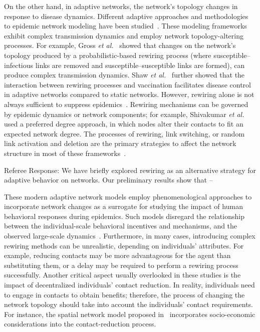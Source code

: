 \documentclass[9pt,twocolumn,twoside]{pnas-new}
\newcommand{\green}[1]{{\textcolor{green!50!black}{#1}}}
\begin{document}
On the other hand, in adaptive networks, the network's topology changes in response to disease dynamics. Different adaptive approaches and methodologies to epidemic network modeling have been studied~\cite{Pastor15,Bansal10}.
These modeling frameworks exhibit complex transmission dynamics and employ network topology-altering processes. For example, Gross {\it et al.}~\cite{gross2006epidemic} showed that changes on the network's topology produced by a probabilistic-based rewiring process (where susceptible–infectious links are removed and susceptible–susceptible links are formed), can produce complex transmission dynamics. Shaw {\it et al.}~\cite{shaw2010enhanced} further showed that the interaction between rewiring processes and vaccination facilitates disease control in adaptive networks compared to static networks.
%
However, rewiring alone is not always sufficient to suppress epidemics~\cite{DONG2015169}. Rewiring mechanisms can be governed by epidemic dynamics or network components; for example, Shivakumar {\it et al.} \cite{Shivakumar12} used a preferred degree approach, in which nodes alter their contacts to fit an expected network degree.
%
The processes of rewiring, link switching, or random link activation and deletion are the primary strategies to affect the network structure in most of these frameworks~\cite{Zhu2019,Guo13,RISAUGUSMAN200952,Ball2022,Kiss2012,Ogura2017}.

\green{Referee Response: We have briefly explored rewiring as an alternative strategy for adaptive behavior on networks. Our preliminary results show that -- }

These modern adaptive network models employ phenomenological approaches to incorporate network changes as a surrogate for studying the impact of human behavioral responses during epidemics. %
Such models disregard the relationship between the individual-scale behavioral incentives and mechanisms,
and the observed large-scale dynamics~\cite{Bansal07, Kao2010}.
%
Furthermore, in many cases, introducing complex rewiring methods can be unrealistic, depending on individuals' attributes. For example, reducing contacts may be more advantageous for the agent than substituting them, or a delay may be required to perform a rewiring process~\cite{Li19} successfully.
%
Another critical aspect usually overlooked in these studies %
is the impact of decentralized individuals' contact reduction. In reality, individuals need to engage in contacts to obtain benefits; therefore, the process of changing the network topology should take into account the individuals' contact requirements. For instance, the spatial network model proposed in~\cite{Maharaj12} incorporates socio-economic considerations into the contact-reduction process.
\end{document}
